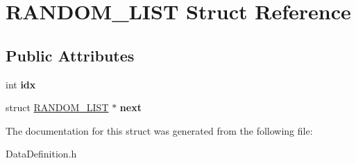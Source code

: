 \hypertarget{structRANDOM__LIST}{\section{R\-A\-N\-D\-O\-M\-\_\-\-L\-I\-S\-T Struct Reference}
\label{structRANDOM__LIST}
}
\subsection*{Public Attributes}
\begin{DoxyCompactItemize}
\item 
\hypertarget{structRANDOM__LIST_a6cd2e0e1e170a5692dc48a4d4c87bdc6}{int {\bfseries idx}}\label{structRANDOM__LIST_a6cd2e0e1e170a5692dc48a4d4c87bdc6}

\item 
\hypertarget{structRANDOM__LIST_a69d18749d83881f09a2742cd6ba19d28}{struct \hyperlink{structRANDOM__LIST}{R\-A\-N\-D\-O\-M\-\_\-\-L\-I\-S\-T} $\ast$ {\bfseries next}}\label{structRANDOM__LIST_a69d18749d83881f09a2742cd6ba19d28}

\end{DoxyCompactItemize}


The documentation for this struct was generated from the following file\-:\begin{DoxyCompactItemize}
\item 
Data\-Definition.\-h\end{DoxyCompactItemize}
